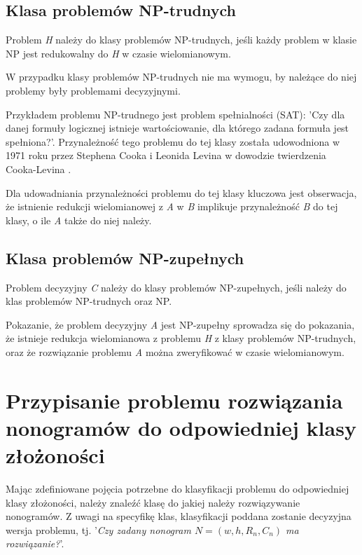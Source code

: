 \subsection{Klasa problemów NP-trudnych}
\begin{definition}
    Problem \textit{H} należy do klasy problemów NP-trudnych, jeśli każdy problem w klasie NP 
jest redukowalny do \textit{H} w czasie wielomianowym.
\end{definition}
    W przypadku klasy problemów NP-trudnych nie ma wymogu, by należące do niej problemy były
problemami decyzyjnymi.
\begin{example}
    Przykładem problemu NP-trudnego jest problem spełnialności (SAT): 'Czy dla danej formuły logicznej
istnieje wartościowanie, dla którego zadana formuła jest spełniona?'. Przynależność tego problemu
do tej klasy została udowodniona w 1971 roku przez Stephena Cooka i Leonida Levina w dowodzie
twierdzenia Cooka-Levina \cite{Cook-Levin}.
\end{example}
    Dla udowadniania przynależności problemu do tej klasy kluczowa jest obserwacja, że istnienie
redukcji wielomianowej z \textit{A} w \textit{B} implikuje przynależność \textit{B} do tej klasy,
o ile \textit{A} także do niej należy.

\subsection{Klasa problemów NP-zupełnych}
\begin{definition}
    Problem decyzyjny \textit{C} należy do klasy problemów NP-zupełnych, jeśli należy do klas problemów
NP-trudnych oraz NP.
\end{definition}
\begin{corollary}
    Pokazanie, że problem decyzyjny \textit{A} jest NP-zupełny sprowadza się do pokazania, że istnieje redukcja
wielomianowa z problemu \textit{H} z klasy problemów NP-trudnych, oraz że rozwiązanie problemu \textit{A}
można zweryfikować w czasie wielomianowym.
\end{corollary}



\section{Przypisanie problemu rozwiązania nonogramów do odpowiedniej klasy złożoności}

    Mając zdefiniowane pojęcia potrzebne do klasyfikacji problemu do odpowiedniej klasy złożoności,
należy znaleźć klasę do jakiej należy rozwiązywanie nonogramów. Z uwagi na specyfikę klas, klasyfikacji
poddana zostanie decyzyjna wersja problemu, tj. 
'\textit{Czy zadany nonogram $N = (w, h, R_n, C_n)$ ma rozwiązanie?}'.



